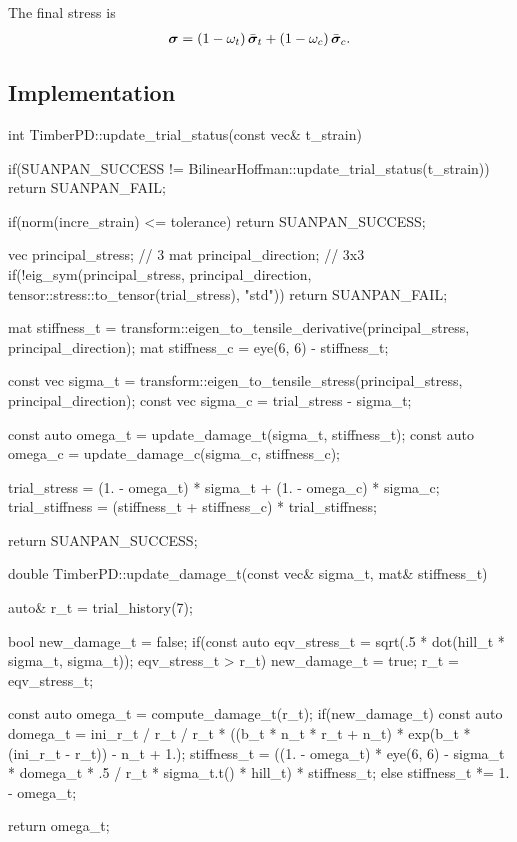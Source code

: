 The final stress is
\begin{gather}
\bm{\sigma}=\left(1-\omega_t\right)\bar{\bm{\sigma}}_t+\left(1-\omega_c\right)\bar{\bm{\sigma}}_c.
\end{gather}
\subsection{Implementation}
\begin{cppcode}
int TimberPD::update_trial_status(const vec& t_strain) {
    if(SUANPAN_SUCCESS != BilinearHoffman::update_trial_status(t_strain)) return SUANPAN_FAIL;

    if(norm(incre_strain) <= tolerance) return SUANPAN_SUCCESS;

    vec principal_stress;    // 3
    mat principal_direction; // 3x3
    if(!eig_sym(principal_stress, principal_direction, tensor::stress::to_tensor(trial_stress), "std")) return SUANPAN_FAIL;

    mat stiffness_t = transform::eigen_to_tensile_derivative(principal_stress, principal_direction);
    mat stiffness_c = eye(6, 6) - stiffness_t;

    const vec sigma_t = transform::eigen_to_tensile_stress(principal_stress, principal_direction);
    const vec sigma_c = trial_stress - sigma_t;

    const auto omega_t = update_damage_t(sigma_t, stiffness_t);
    const auto omega_c = update_damage_c(sigma_c, stiffness_c);

    trial_stress = (1. - omega_t) * sigma_t + (1. - omega_c) * sigma_c;
    trial_stiffness = (stiffness_t + stiffness_c) * trial_stiffness;

    return SUANPAN_SUCCESS;
}

double TimberPD::update_damage_t(const vec& sigma_t, mat& stiffness_t) {
    auto& r_t = trial_history(7);

    bool new_damage_t = false;
    if(const auto eqv_stress_t = sqrt(.5 * dot(hill_t * sigma_t, sigma_t)); eqv_stress_t > r_t) {
        new_damage_t = true;
        r_t = eqv_stress_t;
    }

    const auto omega_t = compute_damage_t(r_t);
    if(new_damage_t) {
        const auto domega_t = ini_r_t / r_t / r_t * ((b_t * n_t * r_t + n_t) * exp(b_t * (ini_r_t - r_t)) - n_t + 1.);
        stiffness_t = ((1. - omega_t) * eye(6, 6) - sigma_t * domega_t * .5 / r_t * sigma_t.t() * hill_t) * stiffness_t;
    }
    else stiffness_t *= 1. - omega_t;

    return omega_t;
}


\end{cppcode}
